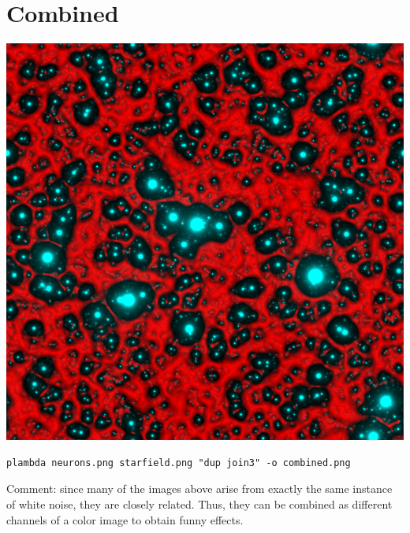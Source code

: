 \section{Combined}
\includegraphics{combined.png}
\begin{verbatim}
plambda neurons.png starfield.png "dup join3" -o combined.png
\end{verbatim}
Comment: since many of the images above arise from exactly the same instance of
white noise, they are closely related.  Thus, they can be combined as
different channels of a color image to obtain funny effects.

